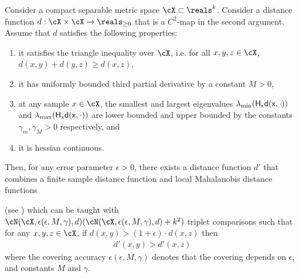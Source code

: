 \begin{theorem}\label{thm: smoothl2} Consider a compact separable metric space $\cX \subset \reals^k$. Consider a distance function $d: \cX \times \cX \to \reals_{\ge 0}$ that is a $C^2$-map in the second argument. Assume that $d$ satisfies the following properties:
\begin{enumerate}
    \item it satisfies the triangle inequality over $\cX$, i.e. for all $x,y,z \in \cX$, $d(x,y) + d(y,z) \ge d(x,z)$,
    \item it has uniformly bounded third partial derivative by a constant $M > 0$, 
    \item at any sample $x \in \cX$, the smallest and largest eigenvalues $\lambda_{\min}(\sf{H}_x d(x,\cdot))$ and $\lambda_{\max}(\sf{H}_x d(x,\cdot))$ are lower bounded and upper bounded by the constants $\gamma_m, \gamma_M > 0$ respectively, and
    \item it is hessian continuous.
\end{enumerate}

Then, for any error parameter $\epsilon > 0$, there exists a distance function $d'$ that combines a finite sample distance function and local Mahalanobis distance functions

(see ) which can be taught with $\cN(\cX, \epsilon(\epsilon, M, \gamma), d) (\cN(\cX, \epsilon(\epsilon, M, \gamma), d) + k^2)$ triplet comparisons such that for any $x,y,z \in \cX$, if $d(x,y) > (1 + \epsilon)\cdot d(x,z)$ then
\begin{align*}
    d'(x,y) > d'(x,z)
\end{align*}
where the covering accuracy $\epsilon(\epsilon, M, \gamma)$ denotes that the covering depends on $\epsilon$, and constants $M$ and $\gamma$.
\end{theorem}

